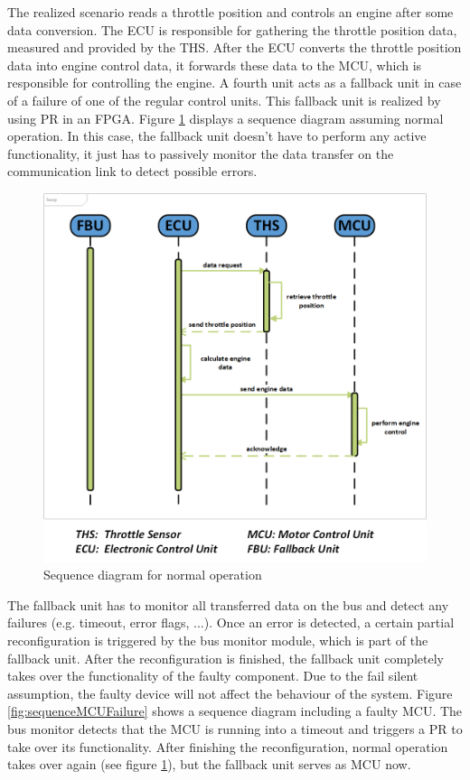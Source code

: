 The realized scenario reads a throttle position and controls an engine after some data conversion. The \gls{ECU} is responsible for gathering the throttle position data, measured and provided by the \gls{THS}. After the \gls{ECU} converts the throttle position data into engine control data, it forwards these data to the \gls{MCU}, which is responsible for controlling the engine. A fourth unit acts as a fallback unit in case of a failure of one of the regular control units. This fallback unit is realized by using \gls{PR} in an \gls{FPGA}. Figure \ref{fig:sequenceNormalOp} displays a sequence diagram assuming normal operation. In this case, the fallback unit doesn't have to perform any active functionality, it just has to passively monitor the data transfer on the communication link to detect possible errors.

\begin{figure}[h!]
    \centering
    \includegraphics[width=\textwidth]{figures/sequence_normal_op.png}
    \caption{Sequence diagram for normal operation}\label{fig:sequenceNormalOp}
\end{figure}

The fallback unit has to monitor all transferred data on the bus and detect any failures (e.g. timeout, error flags, ...). 
Once an error is detected, a certain partial reconfiguration is triggered by the bus monitor module, which is part of the fallback unit. 
After the reconfiguration is finished, the fallback unit completely takes over the functionality of the faulty component. 
Due to the fail silent assumption, the faulty device will not affect the behaviour of the system. 
Figure \ref{fig:sequenceMCUFailure} shows a sequence diagram including a faulty \gls{MCU}. 
The bus monitor detects that the \gls{MCU} is running into a timeout and triggers a \gls{PR} to take over its functionality. 
After finishing the reconfiguration, normal operation takes over again (see figure \ref{fig:sequenceNormalOp}), but the fallback unit serves as \gls{MCU} now.

